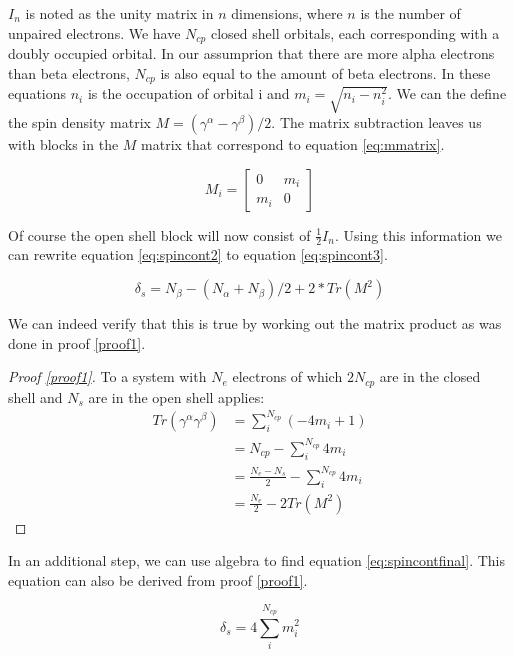 \documentclass[twoside,twocolumn,9pt]{article}
\begin{document}
$I_n$ is noted as the unity matrix in $n$ dimensions, where $n$ is the number of unpaired electrons. We have $N_{cp}$ closed shell orbitals, each corresponding with a doubly occupied
orbital. In our assumprion that there are more alpha electrons than beta electrons, $N_{cp}$ is also equal to the amount of beta electrons. 
In these equations $n_i$ is the occupation of orbital i and $m_i = \sqrt{n_i - n_i^2}$\cite{Scuseria2010}. We can the define the spin density matrix 
$M = (\gamma^\alpha - \gamma^\beta)/2$. The matrix subtraction leaves us with blocks in the $M$ matrix that correspond to equation \eqref{eq:mmatrix}.

\begin{equation}\label{eq:mmatrix}
  M_i = \begin{bmatrix}
    0   & m_i \\
    m_i & 0
  \end{bmatrix}
\end{equation}

Of course the open shell block will now consist of $\frac{1}{2}I_n$. Using this information we can rewrite equation \eqref{eq:spincont2} to equation 
\eqref{eq:spincont3}\cite{Scuseria2010}. 

\begin{equation}\label{eq:spincont3}
  \delta_s = N_\beta - (N_\alpha + N_\beta)/2 + 2*Tr(M^2)
\end{equation}

We can indeed verify that this is true by working out the matrix product as was done in proof \ref{proof1}.

  \begin{proof}[Proof \ref{proof1}]\label{proof1}
    To a system with $N_e$ electrons of which $2N_{cp}$ are in the closed shell and $N_s$ are in the open shell applies:
    \begin{align*}
    Tr(\gamma^\alpha\gamma^\beta) &= \sum^{N_{cp}}_i (-4m_i + 1) \\
    &= N_{cp} - \sum^{N_{cp}}_i 4m_i \\
    &= \frac{N_e - N_s}{2} -\sum^{N_{cp}}_i 4m_i \\
    &= \frac{N_e}{2} - 2Tr(M^2)
  \end{align*}
  \end{proof}

In an additional step, we can use algebra to find equation \eqref{eq:spincontfinal}. This equation can also be derived from proof \ref{proof1}.

\begin{equation}\label{eq:spincontfinal}
  \delta_s = 4\sum^{N_{cp}}_i m_i^2
\end{equation}
\end{document}
